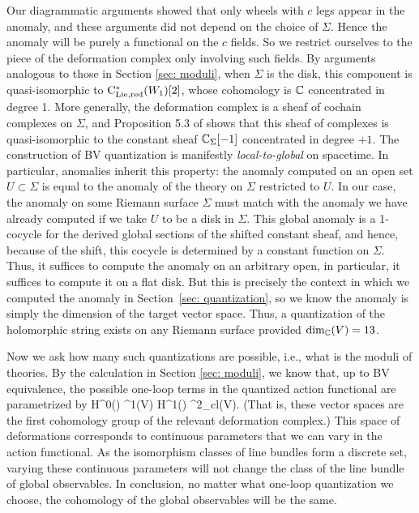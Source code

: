 Our diagrammatic arguments showed that only wheels with $c$ legs appear in the anomaly,
and these arguments did not depend on the choice of $\Sigma$. 
Hence the anomaly will be purely a functional on the $c$ fields.
So we restrict ourselves to the piece of the deformation complex only involving such fields.
By arguments analogous to those in Section \ref{sec: moduli}, 
when $\Sigma$ is the disk,
this component is quasi-isomorphic to ${\rm C}_{\rm Lie,red}^*(W_1)[2]$,
whose cohomology is $\mathbb C$ concentrated in degree 1.
More generally, the deformation complex is a sheaf of cochain complexes on $\Sigma$, 
and Proposition 5.3 of \cite{BWvir} shows that this sheaf of complexes is quasi-isomorphic to the constant sheaf $\mathbb C_\Sigma[-1]$ concentrated in degree $+1$. 
The construction of BV quantization is manifestly {\em local-to-global} on spacetime. 
In particular, anomalies inherit this property: the anomaly computed on an open set $U \subset \Sigma$ is equal to the anomaly of the theory on $\Sigma$ restricted to $U$. 
In our case, the anomaly on some Riemann surface $\Sigma$ must match with the anomaly we have already computed if we take $U$ to be a disk in $\Sigma$.
This global anomaly is a 1-cocycle for the derived global sections of the shifted constant sheaf, 
and hence, because of the shift, this cocycle is determined by a constant function on $\Sigma$.
Thus, it suffices to compute the anomaly on an arbitrary open, 
in particular, it suffices to compute it on a flat disk. 
But this is precisely the context in which we computed the anomaly in Section~\ref{sec: quantization}, 
so we know the anomaly is simply the dimension of the target vector space.
Thus, a quantization of the holomorphic string exists on any Riemann surface provided $\dim_{\mathbb C}(V) = 13$. 

Now we ask how many such quantizations are possible,
i.e., what is the moduli of theories.
By the calculation in Section \ref{sec: moduli}, 
we know that, up to BV equivalence, 
the possible one-loop terms in the quantized action functional are parametrized by
\ben
H^0(\Sigma) \tensor \Omega^1(V) \oplus H^1(\Sigma) \tensor \Omega^2_{cl}(V).
\een 
(That is, these vector spaces are the first  cohomology group of the relevant deformation complex.)
This space of deformations corresponds to continuous parameters that we can vary in the action functional.
As the isomorphism classes of line bundles form a discrete set, 
varying these continuous parameters will not change the class of the line bundle of global observables. 
In conclusion, no matter what one-loop quantization we choose, 
the cohomology of the global observables will be the same.

